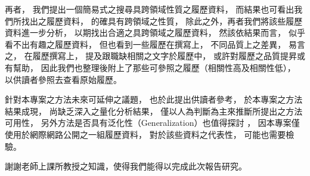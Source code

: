 \documentclass[acmsmall]{acmart}
\begin{document}
再者，
我們提出一個簡易式之搜尋具跨領域性質之履歷資料，
而結果也可看出我們所找出之履歷資料，
的確具有跨領域之性質，
除此之外，再者我們將該些履歷資料進一步分析，
以期找出合適之具跨領域之履歷資料，
然該依結果而言，
似乎看不出有趣之履歷資料，
但也看到一些履歷在撰寫上，
不同品質上之差異，
易言之，
在履歷撰寫上，
提及跟職缺相關之文字於履歷中，
或許對履歷之品質提昇或有幫助，
因此我們也整理後附上了那些可參照之履歷（相關性高及相關性低），
以供讀者參照去查看原始履歷。

針對本專案之方法未來可延伸之議題，
也於此提出供讀者參考，
於本專案之方法結果成現，
尚缺乏深入之量化分析結果，
僅以人為判斷為主來推斷所提出之方法可用性，
另外方法是否具有泛化性（Generalization）也值得探討 \cite{murphy2012machine}，
因本專案僅使用於網際網路公開之一組履歷資料，
對於該些資料之代表性，
可能也需要檢驗。

\begin{acks}
    謝謝老師上課所教授之知識，使得我們能得以完成此次報告研究。
\end{acks}



\end{document}
